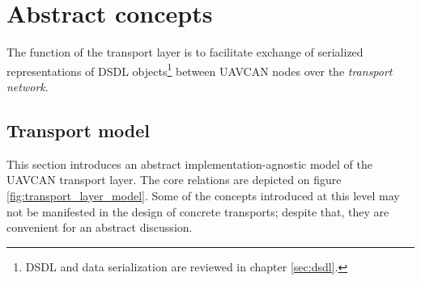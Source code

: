 \section{Abstract concepts}

The function of the transport layer is to facilitate exchange of serialized representations of DSDL objects\footnote{%
    DSDL and data serialization are reviewed in chapter \ref{sec:dsdl}.
} between UAVCAN nodes over the \emph{transport network}.

\subsection{Transport model}\label{sec:transport_model}

This section introduces an abstract implementation-agnostic model of the UAVCAN transport layer.
The core relations are depicted on figure \ref{fig:transport_layer_model}.
Some of the concepts introduced at this level may not be manifested in the design of concrete transports;
despite that, they are convenient for an abstract discussion.

